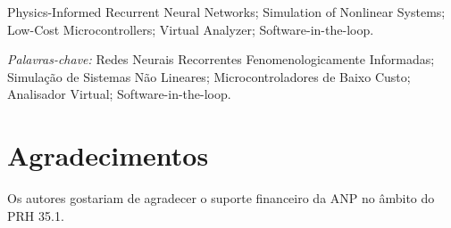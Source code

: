 \documentclass[a4paper]{ifacconf}
\begin{document}
\begin{frontmatter}

  \begin{keyword}
    Physics-Informed Recurrent Neural Networks; Simulation of Nonlinear Systems; Low-Cost Microcontrollers; Virtual Analyzer; Software-in-the-loop.

    \vskip 1mm%
    {\noindent\it Palavras-chave:} Redes Neurais Recorrentes Fenomenologicamente Informadas; Simulação de Sistemas Não Lineares; Microcontroladores de Baixo Custo; Analisador Virtual; Software-in-the-loop.
  \end{keyword}

\end{frontmatter}








\section*{Agradecimentos}
Os autores gostariam de agradecer o suporte financeiro da ANP no âmbito do PRH 35.1.


\end{document}
